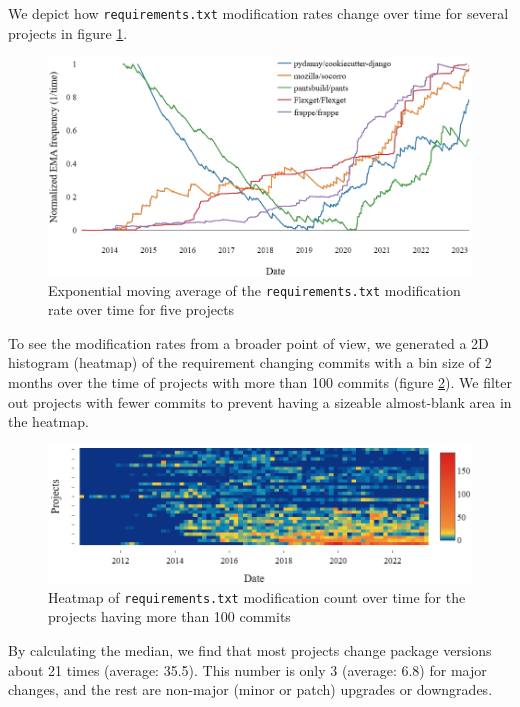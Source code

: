 \documentclass[conference]{IEEEtran}
\begin{document}
We depict how \texttt{requirements.txt} modification rates change over time for several projects in figure \ref{fig3}.

\begin{figure}[h]
\begin{minipage}[h]{\columnwidth}
\centering
  \includegraphics[width=0.9\linewidth]{figs/newplot (1).png}
  \caption{Exponential moving average of the \texttt{requirements.txt} modification rate over time for five projects}
  \label{fig3}
\end{minipage}\hfill
\end{figure}

To see the modification rates from a broader point of view, we generated a 2D histogram (heatmap) of the requirement changing commits with a bin size of 2 months over the time of projects with more than 100 commits (figure \ref{fig4}). We filter out projects with fewer commits to prevent having a sizeable almost-blank area in the heatmap. 

\begin{figure}[h]
\begin{minipage}[h]{\columnwidth}
\centering
  \includegraphics[width=\linewidth]{figs/newplot (2).png}
  \caption{Heatmap of \texttt{requirements.txt} modification count over time for the projects having more than 100 commits}
  \label{fig4}
\end{minipage}\hfill
\end{figure}

By calculating the median, we find that most projects change package versions about 21 times (average: 35.5). This number is only 3 (average: 6.8) for major changes, and the rest are non-major (minor or patch) upgrades or downgrades. 
\end{document}
